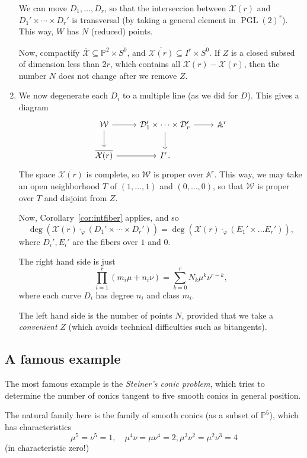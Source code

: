 \documentclass[leqno, openany]{memoir}
\theoremstyle{definition}
\theoremstyle{remark}
\theoremstyle{plain}
\theoremstyle{definition}
\theoremstyle{remark}
\newcommand{\A}{\mathbb{A}}
\renewcommand{\P}{\mathbb{P}}
\newcommand{\mc}[1]{\mathcal{#1}}
\begin{document}
\begin{enumerate}
We can move $D_1, \dots, D_r$, so that the interseccion between $\mc{X}(r)$ and
$D_1' \times \cdots \times D_r'$ is transversal (by taking a general element in
${ \operatorname{PGL}(2) }^r$). This way, $W$ has $N$ (reduced) points. 

Now, compactify $\overline{\mc{X}} \subseteq \P^2 \times \overline{S^0}$, and
$\overline{\mc{X}(r)}\subseteq I^r \times \overline{S^0}$. If $Z$ is a closed
subsed of dimension less than $2r$, which contains all
$\overline{\mc{X}(r)}-\mc{X}(r)$, then the number $N$ does not change after we
remove $Z$.  \item We now degenerate each $D_i$ to a multiple line (as we did
for $D$). This gives a diagram \[ \begin{tikzcd} \mc{W} \arrow[r] \arrow[d] &
\mc{D}_1' \times \cdots \times \mc{D}_r' \arrow[r] \arrow[d] & \A^r \\
\overline{\mc{X}(r)} \arrow[r]& I^r. \end{tikzcd} \] The space
$\overline{\mc{X}(r)}$ is complete, so $\mc{W}$ is proper over $\A^r$. This
way, we may take an open neighborhood $T$ of $(1, \dots, 1)$ and $(0, \dots,
0)$, so that $\mc{W}$ is proper over $T$ and disjoint from $Z$. 

Now, Corollary~\ref{cor:intfiber} applies, and so \[ \deg(\mc{X}(r)
\cdot_\varphi (D_1' \times \cdots \times D_r')) = \deg(\mc{X}(r) \cdot_\varphi
(E_1' \times \dots E_r')), \] where $D_i', E_i'$ are the fibers over $1$ and
$0$.

The right hand side is just \[ \prod_{i=1}^r (m_i \mu + n_i \nu) = \sum_{k=0}^r
N_k \mu^k \nu^{r-k}, \] where each curve $D_i$ has degree $n_i$ and class
$m_i$. 

The left hand side is the number of points $N$, provided that we take a
\emph{convenient} $Z$ (which avoids technical difficulties such as bitangents).
\end{enumerate}

\subsection{A famous example}%

The most famous example is the \emph{Steiner's conic problem}, which tries to
determine the number of conics tangent to five smooth conics in general
position. 

The natural family here is the family of smooth conics (as a subset of $\P^5$),
which has characteristics \[ \mu^5=\nu^5=1, \quad \mu^4\nu=\mu\nu^4=2,
\mu^3\nu^2=\mu^2\nu^3=4 \] (in characteristic zero!)
\end{document}
